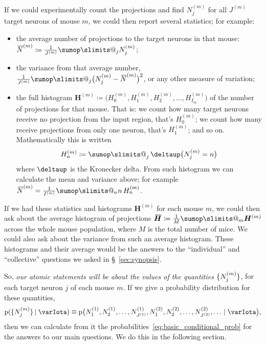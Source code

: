 \documentclass[\ifafour a4paper,12pt,\else a5paper,10pt,\fi%
onecolumn,oneside,article,%
british%
]{memoir}
\makeatletter
\theoremstyle{remark}
\theoremstyle{innote}
\def\sum{\DOTSI\sumop\slimits@}
\newcommand*{\delt}{\deltaup}%
\newcommand*{\defd}{\coloneqq}
\newcommand*{\pf}{\mathrm{p}}%
\renewcommand*{\|}[1][]{\nonscript\,#1\vert\nonscript\;\mathopen{}}
\newcommand*{\sect}{\S}%
\newcommand*{\tsum}{\mathop{\textstyle\sum}\nolimits}
\newcommand*{\widebar}[1]{{\mkern1.5mu\skew{2}\overline{\mkern-1.5mu#1\mkern-1.5mu}\mkern 1.5mu}}
\newcommand*{\yI}{\varIota}
\newcommand*{\yNa}{\widebar{N}}
\newcommand*{\yH}{\bm{H}}
\newcommand*{\yHHm}[1][m]{H^{(#1)}}
\newcommand*{\yHm}[1][m]{\yH^{(#1)}}
\newcommand*{\yIm}[1][m]{I^{(#1)}}
\newcommand*{\yJm}[1][m]{J^{(#1)}}
\newcommand*{\yNm}[1][m]{N^{(#1)}}
\newcommand*{\yNma}[1][m]{\yNa^{(#1)}}
\newcommand*{\yHa}{\widebar{\yH}}
\DeclarePairedDelimiter\tu{\{}{\}}
\makeatother
\begin{document}
If we could experimentally count the projections and find $\yNm_{j}$ for all
$\yJm$ target neurons of mouse $m$,  we could then report several
statistics; for example:
\begin{itemize}[wide]
\item the average number of projections to the target neurons in that
  mouse: $\yNma \defd \frac{1}{\yJm}\sum_{j}\yNm_{j}$;
\item the variance from that average number,
  $\frac{1}{\yJm}\sum_{j}\bigl(\yNm_{j}-\yNma\bigr)^{2}$, or any other measure
  of variation;
\item the full histogram
  $\yHm\defd \bigl(\yHHm_{0},\yHHm_{1}, \yHHm_{2},\dotsc,
  \yHHm_{I_{m}}\bigr)$ of the number of projections for that mouse. That
  is: we count how many target neurons receive no projection from the input
  region, that's $\yHHm_{0}$; we count how many receive projections from
  only one neuron, that's $\yHHm_{1}$; and so on. Mathematically this is
  written
  \begin{equation}
    \label{eq:count_histogram}
    \yHHm_{n} \defd \tsum_{j} \delt\bigl(\yNm_{j} = n\bigr)
  \end{equation}
  where $\delt$ is the Kronecker delta.
  From such histogram we can calculate the mean and variance above; for
  example $\yNma = \frac{1}{\yIm}\sum_{n}n\,\yHHm_{n}$.
\end{itemize}

If we had these statistics and histograms $\yHm$ for each mouse $m$, we
could then ask about the average histogram of projections
$\yHa \defd \frac{1}{M}\sum_{m} \yHm$ across the whole mouse population,
where $M$ is the total number of mice. We could also ask about the variance
from such an average histogram. These histograms and their average would be
the answers to the \enquote{individual} and \enquote{collective} questions
we asked in \sect~\ref{sec:synopsis}.

So, \emph{our atomic statements will be about the values of the quantities
  $\tu{\yNm_{j}}$}, for each target neuron $j$ of each mouse $m$. If we give a
probability distribution for these quantities,
\begin{equation}
  \label{eq:guess_prob_N}
  \pf(\tu{\yNm_{j}} \| \yI)
  \equiv
  \pf\bigl(\yNm[1]_{1}, \yNm[1]_{2},  \dotsc, \yNm[1]_{\yJm[1]},
  \yNm[2]_{1}, \yNm[2]_{2},  \dotsc,\yNm[2]_{\yJm[2]}, \dotsc
  \|  \yI\bigr),
\end{equation}
then we can calculate from it the
probabilities~\eqref{eq:basic_conditional_prob} for the answers to our main
questions. We do this in the following section.
\end{document}
